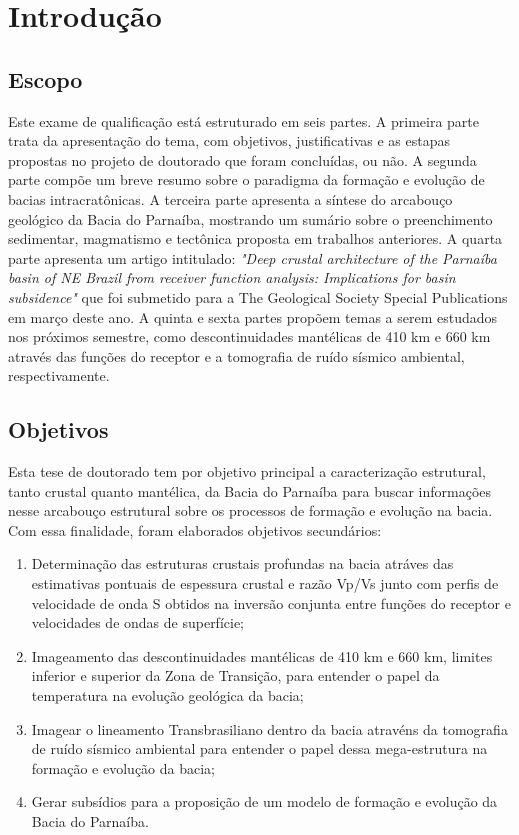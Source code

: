 \chapter{Introdução}


\section{Escopo}

Este exame de qualificação está estruturado em seis partes. A primeira parte
trata da apresentação do tema, com objetivos, justificativas e as estapas propostas no projeto de doutorado que foram concluídas, ou não. A segunda parte compõe um breve resumo sobre o paradigma da formação e evolução de bacias intracratônicas. A terceira parte apresenta a síntese do arcabouço geológico da Bacia do Parnaíba, mostrando um sumário sobre o preenchimento sedimentar, magmatismo e tectônica proposta em trabalhos anteriores. A quarta parte apresenta um artigo intitulado: \textit{"Deep crustal architecture of the Parnaíba basin of NE Brazil from receiver function analysis: Implications for basin subsidence"} que foi submetido para a The Geological Society Special Publications em março deste ano. A quinta e sexta partes propõem temas a serem estudados nos próximos semestre, como descontinuidades mantélicas de 410 km e 660 km através das funções do receptor e a tomografia de ruído sísmico ambiental, respectivamente.

\section{Objetivos}

Esta tese de doutorado tem por objetivo principal a caracterização estrutural, tanto crustal quanto mantélica, da Bacia do Parnaíba para buscar informações nesse arcabouço estrutural sobre os processos de formação e evolução na bacia. Com essa finalidade, foram elaborados objetivos secundários:

\begin{enumerate}
\item Determinação das estruturas crustais profundas na bacia atráves das estimativas pontuais de espessura crustal e razão Vp/Vs junto com perfis de velocidade de onda S obtidos na inversão conjunta entre funções do receptor e velocidades de ondas de superfície;

\item Imageamento das descontinuidades mantélicas de 410 km e 660 km, limites inferior e superior da Zona de Transição, para entender o papel da temperatura na evolução geológica da bacia;

\item Imagear o lineamento Transbrasiliano dentro da bacia atravéns da tomografia de ruído sísmico ambiental para entender o papel dessa mega-estrutura na formação e evolução da bacia;

\item Gerar subsídios para a proposição de um modelo de formação e evolução da Bacia do Parnaíba.

\end{enumerate}

